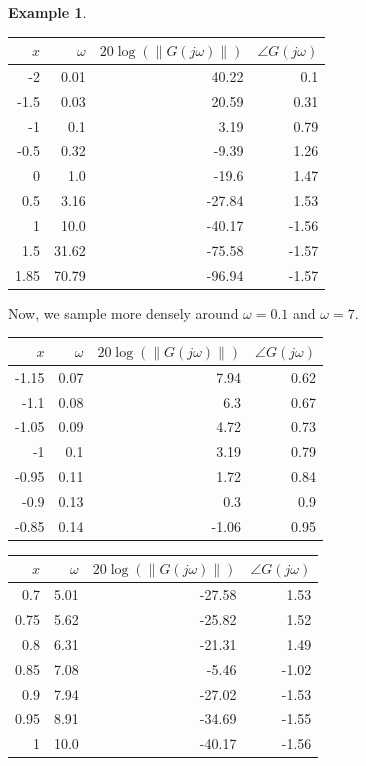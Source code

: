 \documentclass[a4paper,11pt]{report}
\theoremstyle{definition}
\newtheorem{mdexample}{Example}
\newenvironment{example}%
  {\vspace{0.1cm}\begin{mdframed}[backgroundcolor=lightgray]\begin{mdexample}}%
  {\end{mdexample}\end{mdframed}\vspace{0.1cm}}
\begin{document}
\begin{example}
\begin{description}
  \begin{tabular}{|r|r|r|r|}
    \hline
    $x$ & $\omega$ & $20\log(\|G(j\omega)\|)$ & $\angle G(j\omega)$\\
    \hline
    -2 & 0.01 & 40.22 & 0.1 \\
    -1.5 & 0.03 & 20.59 & 0.31 \\
    -1 & 0.1 & 3.19 & 0.79 \\
    -0.5 & 0.32 & -9.39 & 1.26 \\
    0 & 1.0 & -19.6 & 1.47 \\
    0.5 & 3.16 & -27.84 & 1.53 \\
    1 & 10.0 & -40.17 & -1.56 \\
    1.5 & 31.62 & -75.58 & -1.57 \\
    1.85 & 70.79 & -96.94 & -1.57 \\
    \hline
  \end{tabular}

  Now, we sample more densely around $\omega=0.1$ and $\omega=7$.

  \begin{tabular}{|r|r|r|r|}
    \hline
    $x$ & $\omega$ & $20\log(\|G(j\omega)\|)$ & $\angle G(j\omega)$\\
    \hline
    -1.15 & 0.07 & 7.94 & 0.62 \\
    -1.1 & 0.08 & 6.3 & 0.67 \\
    -1.05 & 0.09 & 4.72 & 0.73 \\
    -1 & 0.1 & 3.19 & 0.79 \\
    -0.95 & 0.11 & 1.72 & 0.84 \\
    -0.9 & 0.13 & 0.3 & 0.9 \\
    -0.85 & 0.14 & -1.06 & 0.95 \\
    \hline
  \end{tabular}

  \begin{tabular}{|r|r|r|r|}
    \hline
    $x$ & $\omega$ & $20\log(\|G(j\omega)\|)$ & $\angle G(j\omega)$\\
    \hline
    0.7 & 5.01 & -27.58 & 1.53 \\
    0.75 & 5.62 & -25.82 & 1.52 \\
    0.8 & 6.31 & -21.31 & 1.49 \\
    0.85 & 7.08 & -5.46 & -1.02 \\
    0.9 & 7.94 & -27.02 & -1.53 \\
    0.95 & 8.91 & -34.69 & -1.55 \\
    1 & 10.0 & -40.17 & -1.56 \\
    \hline
  \end{tabular}


\end{description}
\end{example}
\end{document}
